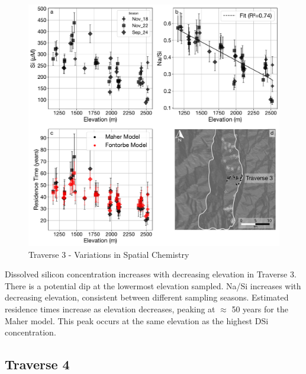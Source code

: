 \begin{figure}[h]
    \centering
        \includegraphics[width=\textwidth]{Traverse_3_summary.pdf}
    \caption{Traverse 3 - Variations in Spatial Chemistry}
    \label{fig:spatial_changes_spring3}
\end{figure}

\FloatBarrier

Dissolved silicon concentration increases with decreasing elevation in Traverse 3. There is a potential dip at the lowermost elevation sampled. Na/Si increases with decreasing elevation, consistent between different sampling seasons. Estimated residence times increase as elevation decreases, peaking at $\approx$ 50 years for the Maher model. This peak occurs at the same elevation as the highest DSi concentration.


\newpage

\subsection{Traverse 4}

